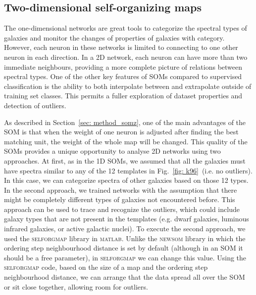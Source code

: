             
    
   

      
    \subsection{Two-dimensional self-organizing maps}
    \label{sec: 2D}
        The one-dimensional networks are great tools to categorize the spectral types of galaxies and monitor the changes of properties of galaxies with category.
        However, each neuron in these networks is limited to connecting to one other neuron in each direction.
        In a 2D network, each neuron can have more than two immediate neighbours, providing a more complete picture of relations between spectral types.
        One of the other key features of SOMs compared to supervised classification is the ability to both interpolate between and extrapolate outside of training set classes.
        This permits a fuller exploration of dataset properties and detection of outliers.
        
        As described in Section~\ref{sec: method_somz}, one of the main advantages of the SOM is that when the weight of one neuron is adjusted after finding the best matching unit, the weight of the whole map will be changed.
        This quality of the SOMs provides a unique opportunity to analyse 2D networks using two approaches. 
        At first, as in the 1D SOMs, we assumed that all the galaxies must have spectra similar to any of the 12 templates in Fig.~\ref{fig: k96}~(i.e. no outliers).
        In this case, we can categorize spectra of other galaxies based on those 12 types.
        In the second approach, we trained networks with the assumption that there might be completely different types of galaxies not encountered before.
        This approach can be used to trace and recognize the outliers, which could include galaxy types that are not present in the  templates (e.g. dwarf galaxies, luminous infrared galaxies, or active galactic nuclei).
        To execute the second approach, we used the \textsc{selforgmap} library in \textsc{matlab}.
        Unlike the \textsc{newsom} library in which the ordering step neighbourhood distance is set by default (although in an SOM it should be a free parameter), in \textsc{selforgmap} we can change this value.
        Using the \textsc{selforgmap} code, based on the size of a map and the ordering step neighbourhood distance, we can arrange that the data spread all over the SOM or sit close together, allowing room for outliers.

